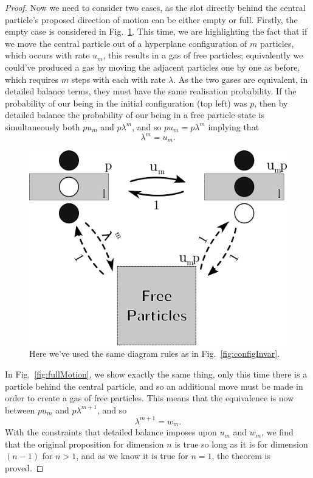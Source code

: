 \begin{proof}
Now we need to consider two cases, as the slot directly behind the central particle's proposed direction of motion can be either
empty or full. Firstly, the empty case is considered in Fig.~\ref{fig:emptyMotion}. This time, we are highlighting the fact that if we move the central particle out of a hyperplane configuration of $m$ particles, which occurs with rate $u_m$, this results in a gas of free particles;
 equivalently we could've produced a gas by moving the adjacent particles one by one as before, which requires $m$ steps with each with rate $\lambda$. As the two gases are equivalent, in detailed balance terms, they must have the same realisation probability. If the
 probability of our being in the initial configuration (top left) was $p$, then by detailed balance the probability of our being in
 a free particle state is simultaneously both $p u_m$ and $p \lambda^m$, and so
 $p u_m = p \lambda^m $ implying that
 \begin{equation}
  \lambda^m = u_m .
 \end{equation}
 
 \begin{figure}[h!]
 \caption[Figure demonstrating that particle motion out of a hyperplane with $m$ adjacent particles away from an empty space moves with rate $\lambda^m$.]{\label{fig:emptyMotion} 
 Here we've used the same diagram rules as in Fig.~\ref{fig:configInvar}. 
 }
  \begin{center}
 \includegraphics[width=0.66\linewidth]{analytics/images/ndDBuCycle}
  \end{center}
\end{figure}

In Fig.~\ref{fig:fullMotion}, we show exactly the same thing, only this time there is a particle behind the central particle, and so an
additional move must be made in order to create a gas of free particles. This means that the equivalence is now between $p u_m$ and
$p \lambda^{m+1}$, and so
 \begin{equation}
  \lambda^{m+1} = w_m .
 \end{equation}
 With the constraints that detailed balance imposes upon $u_m$ and $w_m$, we find that the original proposition for dimension $n$ is true so long as it is for dimension $(n-1)$ for $n>1$, and as we know it is true for $n=1$, the theorem is proved.


\end{proof}
